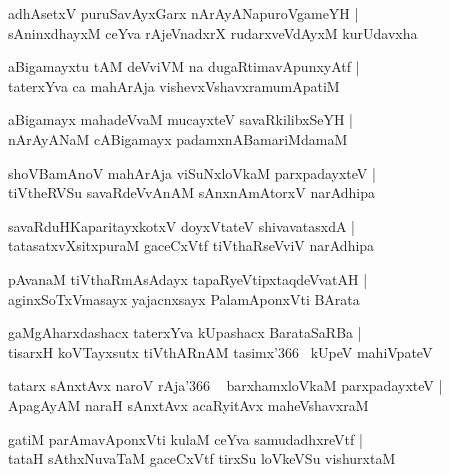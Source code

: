 \documentclass[twoside,12pt,openright]{book}
\newcounter{shloka}[chapter]
\begin{document}
\begin{shloka}
adhAsetxV puruSavAyxGarx nArAyANapuroVgameYH |\\
sAninxdhayxM ceYva rAjeVnadxrX rudarxveVdAyxM kurUdavxha 
\end{shloka}


\begin{shloka}
aBigamayxtu tAM deVviVM na dugaRtimavApunxyAtf |\\
taterxYva ca mahArAja vishevxVshavxramumApatiM 
\end{shloka}

\begin{shloka}
aBigamayx mahadeVvaM mucayxteV savaRkilibxSeYH |\\
nArAyANaM cABigamayx padamxnABamariMdamaM 
\end{shloka}

\begin{shloka}
shoVBamAnoV mahArAja viSuNxloVkaM parxpadayxteV |\\
tiVtheRVSu savaRdeVvAnAM sAnxnAmAtorxV narAdhipa 
\end{shloka}

\begin{shloka}
savaRduHKaparitayxkotxV doyxVtateV shivavatasxdA |\\
tatasatxvXsitxpuraM gaceCxVtf tiVthaRseVviV narAdhipa 
\end{shloka}

\begin{shloka}
pAvanaM tiVthaRmAsAdayx tapaRyeVtipxtaqdeVvatAH |\\
aginxSoTxVmasayx yajacnxsayx PalamAponxVti BArata
\end{shloka}

\begin{shloka}
gaMgAharxdashacx taterxYva kUpashacx BarataSaRBa |\\
tisarxH koVTayxsutx tiVthARnAM tasimx\char'366 ~kUpeV mahiVpateV 
\end{shloka}

\begin{shloka}
tatarx sAnxtAvx naroV rAja\char'366 ~ barxhamxloVkaM parxpadayxteV |\\
ApagAyAM naraH sAnxtAvx acaRyitAvx maheVshavxraM 
\end{shloka}

\begin{shloka}
gatiM parAmavAponxVti kulaM ceYva samudadhxreVtf |\\
tataH sAthxNuvaTaM gaceCxVtf tirxSu loVkeVSu vishurxtaM 
\end{shloka}
\end{document}
